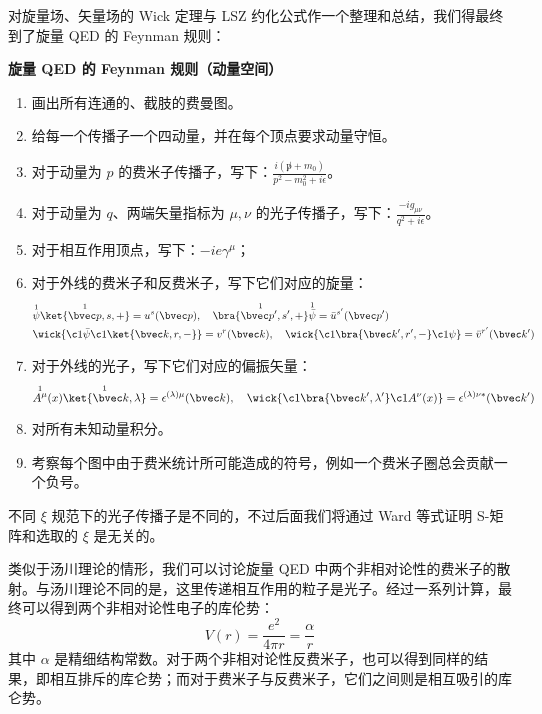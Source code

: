 
对旋量场、矢量场的 Wick 定理与 LSZ 约化公式作一个整理和总结，我们得最终到了旋量 QED 的 Feynman 规则：

\textbf{旋量 QED 的 Feynman 规则（动量空间）}
\begin{enumerate}
\item 画出所有连通的、截肢的费曼图。
\item 给每一个传播子一个四动量，并在每个顶点要求动量守恒。
\item 对于动量为 $p$ 的费米子传播子，写下：$\frac{i(\not p+m_0)}{p^2-m_0^2 + i\epsilon}$。
\item 对于动量为 $q$、两端矢量指标为 $\mu,\nu$ 的光子传播子，写下：$\frac{-ig_{\mu\nu}}{q^2 + i\epsilon}$。
\item 对于相互作用顶点，写下：$-ie\gamma^\mu$；
\item 对于外线的费米子和反费米子，写下它们对应的旋量：
\begin{align*}
&\overset{1}{\psi}\overset{1}{\ket{\bvec p,s,+}}=u^s(\bvec p),\quad \overset{1}{\bra{\bvec p',s',+}} \overset{1}{\bar\psi}=\bar u^{s'}(\bvec p')\\
&\wick{\c1{\bar\psi}\c1{\ket{\bvec k,r,-}}}=v^{r}(\bvec k),\quad \wick{\c1{\bra{\bvec k',r',-}} \c1\psi}=\bar v^{r'}(\bvec k')
\end{align*}
\item 对于外线的光子，写下它们对应的偏振矢量：
\[
\overset{1}{A^\mu}(x) \overset{1}{\ket{\bvec k,\lambda}}=\epsilon^{(\lambda)\mu}(\bvec k),\quad \wick{\c1{\bra{\bvec k',\lambda'}}\c1A^\nu(x) }=\epsilon^{(\lambda)\nu*}(\bvec k')
\]
\item 
对所有未知动量积分。
\item 
考察每个图中由于费米统计所可能造成的符号，例如一个费米子圈总会贡献一个负号。
\end{enumerate}
不同 $\xi$ 规范下的光子传播子是不同的，不过后面我们将通过 Ward 等式证明 S-矩阵和选取的 $\xi$ 是无关的。

类似于汤川理论的情形，我们可以讨论旋量 QED 中两个非相对论性的费米子的散射。与汤川理论不同的是，这里传递相互作用的粒子是光子。经过一系列计算，最终可以得到两个非相对论性电子的库伦势：
\[
V(r)=\frac{e^2}{4\pi r}=\frac{\alpha}{r}
\]
其中 $\alpha$ 是精细结构常数。对于两个非相对论性反费米子，也可以得到同样的结果，即相互排斥的库仑势；而对于费米子与反费米子，它们之间则是相互吸引的库仑势。
